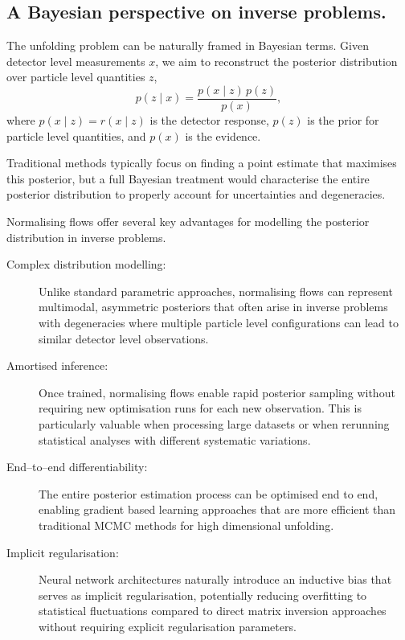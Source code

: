 \subsection{A Bayesian perspective on inverse problems.}
    The unfolding problem can be naturally framed in Bayesian terms.
    Given detector level measurements \(x\), we aim to reconstruct the posterior distribution over particle level quantities \(z\),
    \[
        \label{eq:bayes-theorem}
        p(z\mid x) = \frac{p(x\mid z)\,p(z)}{p(x)},
    \]
    where \(p(x\mid z) =  r(x\mid z)\) is the detector response, $p(z)$ is the prior for particle level quantities, and $p(x)$ is the evidence.
    
    Traditional methods typically focus on finding a point estimate that maximises this posterior, but a full Bayesian treatment would characterise the entire posterior distribution to properly account for uncertainties and degeneracies.

    Normalising flows offer several key advantages for modelling the posterior distribution in inverse problems.
    \begin{description}
        \item[Complex distribution modelling:] Unlike standard parametric approaches, normalising flows can represent multimodal, asymmetric posteriors that often arise in inverse problems with degeneracies where multiple particle level configurations can lead to similar detector level observations.
        \item[Amortised inference:] Once trained, normalising flows enable rapid posterior sampling without requiring new optimisation runs for each new observation.
        This is particularly valuable when processing large datasets or when rerunning statistical analyses with different systematic variations.
        \item[End--to--end differentiability:] The entire posterior estimation process can be optimised end to end, enabling gradient based learning approaches that are more efficient than traditional MCMC methods for high dimensional unfolding.
        \item[Implicit regularisation:] Neural network architectures naturally introduce an inductive bias that serves as implicit regularisation, potentially reducing overfitting to statistical fluctuations compared to direct matrix inversion approaches without requiring explicit regularisation parameters.
    \end{description}

